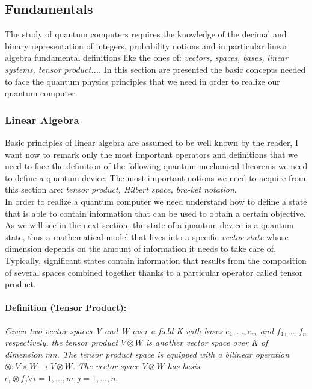 \documentclass[english]{article}
\begin{document}
		\subsection{Fundamentals}
		\label{sec:fundamentals}
			The study of quantum computers requires the knowledge of the decimal and binary representation of integers, probability notions and in particular linear algebra fundamental definitions like the ones of: \emph{vectors, spaces, bases, linear systems, tensor product...}. In this section are presented the basic concepts needed to face the quantum physics principles that we need in order to realize our quantum computer. 
			
			\subsubsection{Linear Algebra}
			\label{sec:linearAlgebra}
			Basic principles of linear algebra are assumed to be well known by the reader, I want now to remark only the most important operators and definitions that we need to face the definition of the following quantum mechanical theorems we need to define a quantum device. The most important notions we need to acquire from this section are: \emph{tensor product, Hilbert space, bra-ket notation}.\\
			
			In order to realize a quantum computer we need understand how to define a state that is able to contain information that can be used to obtain a certain objective. As we will see in the next section, the state of a quantum device is a quantum state, thus a mathematical model that lives into a specific \emph{vector state} whose dimension depends on the amount of information it needs to take care of. Typically, significant states contain information that results from the composition of several spaces combined together thanks to a particular operator called tensor product.
			
			\paragraph{Definition (Tensor Product):} \emph{Given two vector spaces V and W over a field K with bases $e_1,..., e_m$ and
$f_1,..., f_n$ respectively, the tensor product $V \otimes W$ is another vector space over K of dimension
mn. The tensor product space is equipped with a bilinear operation $\otimes : V \times W \rightarrow V \otimes W$. The
vector space $V \otimes W$ has basis $e_i \otimes f_j \forall i = 1,...,m, j = 1,...,n$}. \\
			
\end{document}
